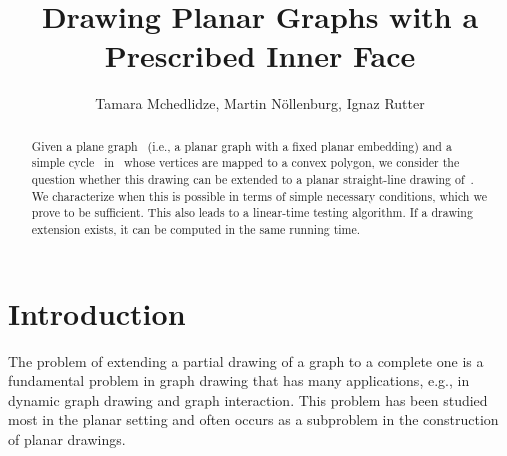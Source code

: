 \documentclass{llncs}
\begin{document}
\title{Drawing Planar Graphs with a Prescribed Inner Face}

\author{
  Tamara Mchedlidze,
  Martin N\"{o}llenburg,
	Ignaz Rutter
}






\maketitle

\begin{abstract}
  Given a plane graph~ (i.e., a planar graph with a fixed planar
  embedding) and a simple cycle~ in~ whose vertices are mapped
  to a convex polygon, we consider the question
  whether this drawing can be extended to a planar straight-line drawing
  of~.  We characterize when this is possible in terms of simple
  necessary conditions, which we prove to be sufficient.  This also
  leads to a linear-time testing algorithm.  If a drawing extension
  exists, it can be computed in the same running time.
\end{abstract}


\section{Introduction}

The problem of extending a partial drawing of a graph to a complete
one is a fundamental problem in graph drawing that has many
applications, e.g., in dynamic graph drawing and graph interaction.  This problem has been
studied most in the planar setting and often occurs as a subproblem in the construction 
of planar drawings.
\end{document}
